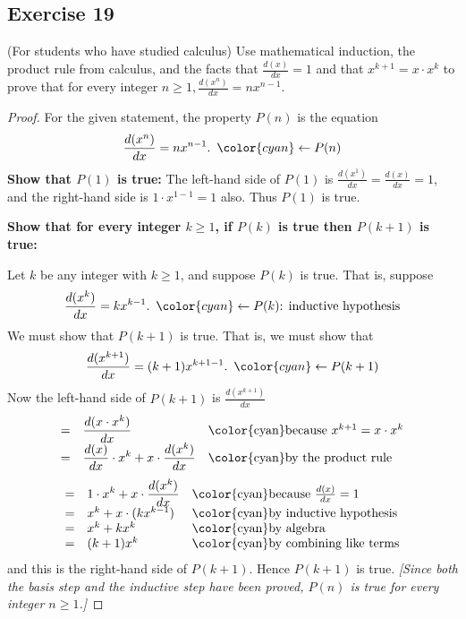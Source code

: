 \documentclass[14pt]{extarticle}
\newcommand{\dps}{\displaystyle}
\newcommand{\from}{\leftarrow}
\newcommand{\cy}{\color{cyan}}
\begin{document}
\subsection{Exercise 19}
(For students who have studied calculus) Use mathematical induction, the product rule from calculus, and the facts that $\dps \frac{d(x)}{dx} = 1$ and that $x^{k+1} = x\cdot x^k$ to prove that for every integer $\dps n \geq 1, \frac{d(x^n)}{dx} = n x^{n-1}$.

\begin{proof}
    For the given statement, the property $P(n)$ is the equation
    \[
        \dps \frac{d(x^n)}{dx} = n x^{n-1}. \,\,\, {\cy \from P(n)}
    \]
    {\bf Show that $P(1)$ is true:} The left-hand side of $P(1)$ is $\dps \frac{d(x^1)}{dx} = \frac{d(x)}{dx} = 1$, and the right-hand side is $1 \cdot x^{1-1} = 1$ also. Thus $P(1)$ is true.

        {\bf Show that for every integer $k \geq 1$, if $P(k)$ is true then $P(k + 1)$ is true:}

    Let $k$ be any integer with $k \geq 1$, and suppose $P(k)$ is true. That is, suppose
    \[
        \dps \frac{d(x^k)}{dx} = k x^{k-1}. \,\,\, {\cy \from P(k) \text{: inductive hypothesis}}
    \]
    We must show that $P(k + 1)$ is true. That is, we must show that
    \[
        \dps \frac{d(x^{k+1})}{dx} = (k+1) x^{k+1-1}. \,\,\,{\cy \from P(k+1)}
    \]
    Now the left-hand side of $P(k+1)$ is $\dps \frac{d(x^{k+1})}{dx}$
    \[
        \begin{array}{lll}
            = & \dps \frac{d(x\cdot x^k)}{dx}                           & \text{\cy because $x^{k+1} = x\cdot x^k$} \\
            = & \dps \frac{d(x)}{dx}\cdot x^k + x\cdot\frac{d(x^k)}{dx} & \text{\cy by the product rule}
        \end{array}
    \]
    \[
        \begin{array}{lll}
            = & \dps 1 \cdot x^k + x\cdot\frac{d(x^k)}{dx} & \text{\cy because $\frac{d(x)}{dx} = 1$} \\
            = & x^k + x\cdot(k x^{k-1})                    & \text{\cy by inductive hypothesis}       \\
            = & x^k + kx^k                                 & \text{\cy by algebra}                    \\
            = & (k+1)x^k                                   & \text{\cy by combining like terms}
        \end{array}
    \]
    and this is the right-hand side of $P(k + 1)$. Hence $P(k + 1)$ is true. {\it [Since both the basis step and the inductive step have been proved, $P(n)$ is true for every integer $n \geq 1$.]}
\end{proof}
\end{document}
